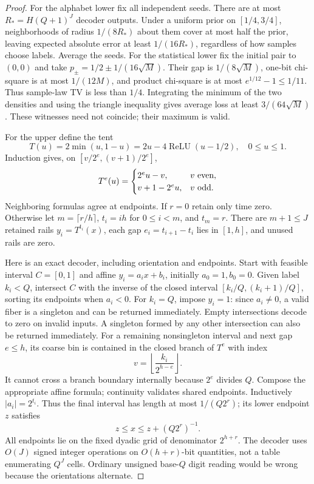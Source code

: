\documentclass[11pt,letterpaper]{article}
\theoremstyle{definition}\newtheorem{definition}[theorem]{Definition}
\theoremstyle{remark}\newtheorem{remark}[theorem]{Remark}
\begin{document}
\begin{proof}
For the alphabet lower fix all independent seeds. There are at most $R_*=H(Q+1)^J$ decoder outputs. Under a uniform prior on $[1/4,3/4]$, neighborhoods of radius $1/(8R_*)$ about them cover at most half the prior, leaving expected absolute error at least $1/(16R_*)$, regardless of how samples choose labels. Average the seeds. For the statistical lower fix the initial pair to $(0,0)$ and take $p_\pm=1/2\pm1/(16\sqrt M)$. Their gap is $1/(8\sqrt M)$, one-bit chi-square is at most $1/(12M)$, and product chi-square is at most $e^{1/12}-1\le1/11$. Thus sample-law TV is less than $1/4$. Integrating the minimum of the two densities and using the triangle inequality gives average loss at least $3/(64\sqrt M)$. These witnesses need not coincide; their maximum is valid.

For the upper define the tent
\[
 T(u)=2\min(u,1-u)=2u-4\operatorname{ReLU}(u-1/2),\quad 0\le u\le1.
\]
Induction gives, on $[v/2^e,(v+1)/2^e]$,
\[
 T^e(u)=\begin{cases}2^eu-v,&v\hbox{ even},\\v+1-2^eu,&v\hbox{ odd}.\end{cases}
\]
Neighboring formulas agree at endpoints. If $r=0$ retain only time zero. Otherwise let $m=\lceil r/h\rceil$, $t_i=ih$ for $0\le i<m$, and $t_m=r$. There are $m+1\le J$ retained rails $y_i=T^{t_i}(x)$, each gap $e_i=t_{i+1}-t_i$ lies in $[1,h]$, and unused rails are zero.

Here is an exact decoder, including orientation and endpoints. Start with feasible interval $C=[0,1]$ and affine $y_i=a_ix+b_i$, initially $a_0=1,b_0=0$. Given label $k_i< Q$, intersect $C$ with the inverse of the closed interval $[k_i/Q,(k_i+1)/Q]$, sorting its endpoints when $a_i<0$. For $k_i=Q$, impose $y_i=1$: since $a_i\ne0$, a valid fiber is a singleton and can be returned immediately. Empty intersections decode to zero on invalid inputs. A singleton formed by any other intersection can also be returned immediately. For a remaining nonsingleton interval and next gap $e\le h$, its coarse bin is contained in the closed branch of $T^e$ with index
\[
 v=\left\lfloor\frac{k_i}{2^{h-e}}\right\rfloor.
\]
It cannot cross a branch boundary internally because $2^e$ divides $Q$. Compose the appropriate affine formula; continuity validates shared endpoints. Inductively $|a_i|=2^{t_i}$. Thus the final interval has length at most $1/(Q2^r)$; its lower endpoint $z$ satisfies
\[
 z\le x\le z+(Q2^r)^{-1}.
\]
All endpoints lie on the fixed dyadic grid of denominator $2^{h+r}$. The decoder uses $O(J)$ signed integer operations on $O(h+r)$-bit quantities, not a table enumerating $Q^J$ cells. Ordinary unsigned base-$Q$ digit reading would be wrong because the orientations alternate.


\end{proof}
\end{document}
